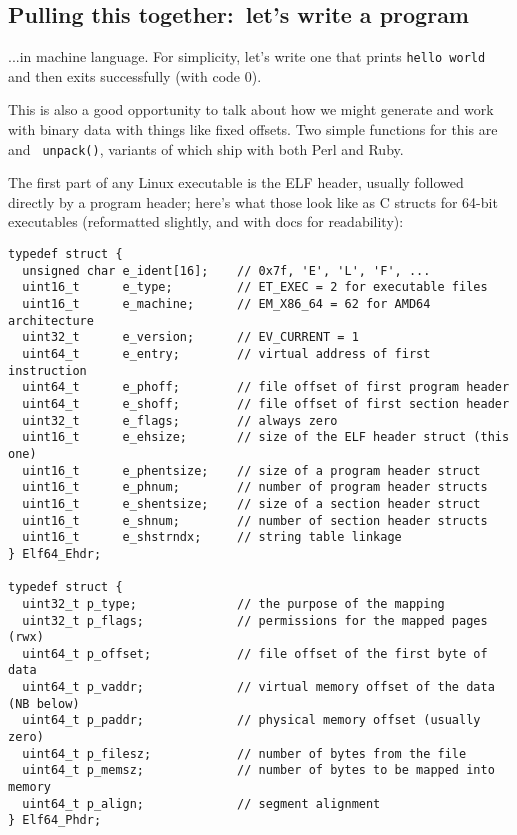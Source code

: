 \subsection{Pulling this together:~let's write a program}
...in machine language. For simplicity, let's write one that prints {\tt hello
world} and then exits successfully (with code 0).

This is also a good opportunity to talk about how we might generate and work
with binary data with things like fixed offsets. Two simple functions for this
are  and {\tt
unpack()}, variants of which ship with both Perl and Ruby.

The first part of any Linux executable is the ELF header, usually followed
directly by a program header; here's what those look like as C structs for
64-bit executables (reformatted slightly, and with docs for readability):

\begin{verbatim}
typedef struct {
  unsigned char e_ident[16];    // 0x7f, 'E', 'L', 'F', ...
  uint16_t      e_type;         // ET_EXEC = 2 for executable files
  uint16_t      e_machine;      // EM_X86_64 = 62 for AMD64 architecture
  uint32_t      e_version;      // EV_CURRENT = 1
  uint64_t      e_entry;        // virtual address of first instruction
  uint64_t      e_phoff;        // file offset of first program header
  uint64_t      e_shoff;        // file offset of first section header
  uint32_t      e_flags;        // always zero
  uint16_t      e_ehsize;       // size of the ELF header struct (this one)
  uint16_t      e_phentsize;    // size of a program header struct
  uint16_t      e_phnum;        // number of program header structs
  uint16_t      e_shentsize;    // size of a section header struct
  uint16_t      e_shnum;        // number of section header structs
  uint16_t      e_shstrndx;     // string table linkage
} Elf64_Ehdr;

typedef struct {
  uint32_t p_type;              // the purpose of the mapping
  uint32_t p_flags;             // permissions for the mapped pages (rwx)
  uint64_t p_offset;            // file offset of the first byte of data
  uint64_t p_vaddr;             // virtual memory offset of the data (NB below)
  uint64_t p_paddr;             // physical memory offset (usually zero)
  uint64_t p_filesz;            // number of bytes from the file
  uint64_t p_memsz;             // number of bytes to be mapped into memory
  uint64_t p_align;             // segment alignment
} Elf64_Phdr;\end{verbatim}

